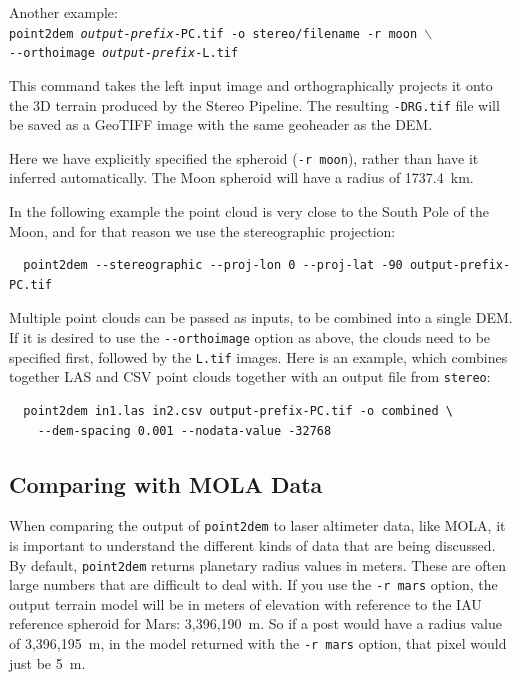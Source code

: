 Another example: \\
\hspace*{2em}\texttt{point2dem \textit{output-prefix}-PC.tif -o stereo/filename -r moon $\backslash$} \\
\hspace*{4em}\texttt{-\/-orthoimage \textit{output-prefix}-L.tif}

This command takes the left input image and orthographically projects
it onto the 3D terrain produced by the Stereo Pipeline.  The resulting
{\tt *-DRG.tif} file will be saved as a GeoTIFF image with the same
geoheader as the DEM.

Here we have explicitly specified the spheroid (\texttt{-r moon}), rather
than have it inferred automatically. The Moon spheroid will have
a radius of 1737.4~km.

In the following example the point cloud is very close to the
South Pole of the Moon, and for that reason we use the stereographic projection:
\begin{verbatim}
  point2dem --stereographic --proj-lon 0 --proj-lat -90 output-prefix-PC.tif
\end{verbatim}

Multiple point clouds can be passed as inputs, to be combined into a
single \ac{DEM}. If it is desired to use the \texttt{-\/-orthoimage}
option as above, the clouds need to be specified first, followed by the
\texttt{L.tif} images. Here is an example, which combines together LAS
and CSV point clouds together with an output file from {\tt stereo}:
\begin{verbatim}
  point2dem in1.las in2.csv output-prefix-PC.tif -o combined \
    --dem-spacing 0.001 --nodata-value -32768
\end{verbatim}

\subsection{Comparing with MOLA Data}
\label{molacmp}

When comparing the output of \texttt{point2dem} to laser altimeter
data, like MOLA, it is important to understand the different kinds
of data that are being discussed.  By default, \texttt{point2dem}
returns planetary radius values in meters.  These are often large
numbers that are difficult to deal with.  If you use the \texttt{-r
mars} option, the output terrain model will be in meters of elevation
with reference to the IAU reference spheroid for Mars: 3,396,190~m.
So if a post would have a radius value of 3,396,195~m, in the model
returned with the \texttt{-r mars} option, that pixel would just be 5~m.

